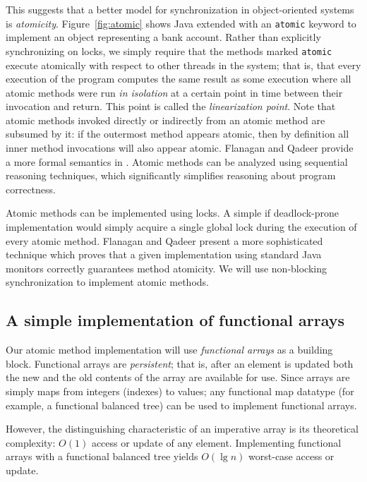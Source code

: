 \documentclass[preprint]{rdbacmconf}
\newcommand{\atomic}{\texttt{atomic}\xspace}
\begin{document}
This suggests that a better model for synchronization in
object-oriented systems is \emph{atomicity}.  Figure~\ref{fig:atomic}
shows Java extended with an \atomic keyword to implement an
object representing a bank account.  Rather than explicitly
synchronizing on locks, we simply require that the methods marked
\atomic execute atomically with respect to other threads in the
system; that is, that every execution of the program computes the same
result as some execution where all atomic methods were run \emph{in
  isolation} at a certain point in time between their invocation and return.
This point is called the \emph{linearization point}.  Note that
atomic methods invoked directly or indirectly from an atomic
method are subsumed by it: if the outermost method appears atomic,
then by definition all inner method invocations will also appear atomic.
Flanagan and Qadeer provide a more formal semantics in \cite{FlanaganQa03}.
Atomic methods can be analyzed using sequential reasoning techniques, which
significantly simplifies reasoning about program correctness.

Atomic methods can be implemented using locks.  A simple if deadlock-prone 
implementation would simply acquire a single global lock during
the execution of every atomic method.  Flanagan and Qadeer
\cite{FlanaganQa03} present a more sophisticated technique which proves that
a given implementation using standard Java monitors correctly
guarantees method atomicity.
We will use non-blocking synchronization to implement atomic methods.

\subsection{A simple implementation of functional arrays}
Our atomic method implementation will use \emph{functional arrays} as
a building block.  Functional arrays are \emph{persistent}; that is,
after an element is updated both the new and the old contents of the
array are available for use.  Since arrays are simply maps from
integers (indexes) to values; any functional map datatype (for
example, a functional balanced tree) can be used to implement
functional arrays.

However, the distinguishing characteristic of an imperative array is its
theoretical complexity: $O(1)$ access or update of any element.
Implementing functional arrays with a functional balanced tree yields
$O(\lg n)$ worst-case access or update.
\end{document}
